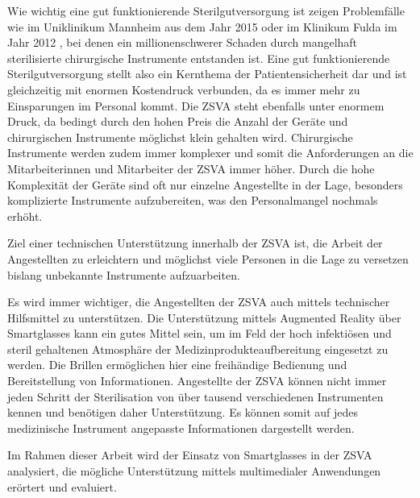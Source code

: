 Wie wichtig eine gut funktionierende Sterilgutversorgung ist zeigen Problemfälle wie im Uniklinikum Mannheim \cite{Brandt2015} aus dem Jahr 2015 oder im Klinikum Fulda im Jahr 2012 \cite{HygieneFuldar2012}, bei denen ein millionenschwerer Schaden durch mangelhaft sterilisierte chirurgische Instrumente entstanden ist. Eine gut funktionierende Sterilgutversorgung stellt also ein Kernthema der Patientensicherheit dar und ist gleichzeitig mit enormen Kostendruck verbunden, da es immer mehr zu Einsparungen im Personal kommt. Die ZSVA steht ebenfalls unter enormem Druck, da bedingt durch den hohen Preis die Anzahl der Geräte und chirurgischen Instrumente möglichst klein gehalten wird. Chirurgische Instrumente werden zudem immer komplexer und somit die Anforderungen an die Mitarbeiterinnen und Mitarbeiter der ZSVA immer höher. Durch die hohe Komplexität der Geräte sind oft nur einzelne Angestellte in der Lage, besonders komplizierte Instrumente aufzubereiten, was den Personalmangel nochmals erhöht.

Ziel einer technischen Unterstützung innerhalb der ZSVA ist, die Arbeit der Angestellten zu erleichtern und möglichst viele Personen in die Lage zu versetzen bislang unbekannte Instrumente aufzuarbeiten.

Es wird immer wichtiger, die Angestellten der ZSVA auch mittels technischer Hilfsmittel zu unterstützen. Die Unterstützung mittels Augmented Reality über Smartglasses kann ein gutes Mittel sein, um im Feld der hoch infektiösen und steril gehaltenen Atmosphäre der Medizinprodukteaufbereitung eingesetzt zu werden. Die Brillen ermöglichen hier eine freihändige Bedienung und Bereitstellung von Informationen. Angestellte der ZSVA können nicht immer jeden Schritt der Sterilisation von über tausend verschiedenen Instrumenten kennen und benötigen daher Unterstützung. Es können somit auf jedes medizinische Instrument angepasste Informationen dargestellt werden. 

Im Rahmen dieser Arbeit wird der Einsatz von Smartglasses in der ZSVA analysiert, die mögliche Unterstützung mittels multimedialer Anwendungen erörtert und evaluiert. 

\begin{comment}
 
 
 



    
\end{comment}